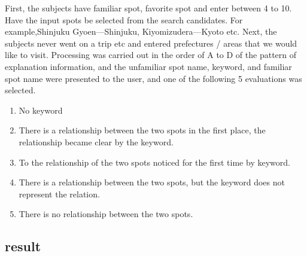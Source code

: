 \documentclass[journal]{IAENGtran}
\begin{document}
First, the subjects have familiar spot, favorite spot and enter between 4 to 10.
Have the input spots be selected from the search candidates.
For example,Shinjuku Gyoen---Shinjuku, Kiyomizudera---Kyoto etc.
Next, the subjects never went on a trip etc and entered prefectures / areas that we would like to visit.
Processing was carried out in the order of A to D of the pattern of explanation information, and the unfamiliar spot name, keyword, and familiar spot name were presented to the user, and one of the following 5 evaluations was selected.
\begin{enumerate}
  \item No keyword
  \item There is a relationship between the two spots in the first place, the relationship became clear by the keyword.
  \item To the relationship of the two spots noticed for the first time by keyword.
  \item There is a relationship between the two spots, but the keyword does not represent the relation.
  \item There is no relationship between the two spots.
\end{enumerate}

\subsection{result}
\label{subsec:result}
\end{document}
